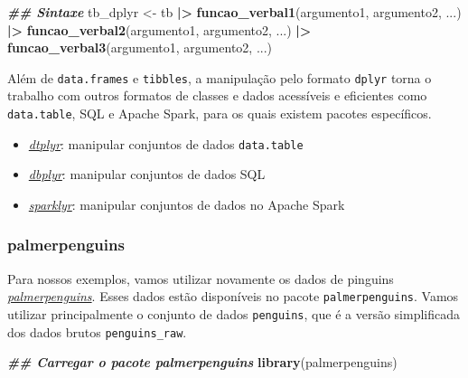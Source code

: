 \documentclass[
]{article}
\newenvironment{Shaded}{\begin{snugshade}}{\end{snugshade}}
\newcommand{\DocumentationTok}[1]{\textcolor[rgb]{0.56,0.35,0.01}{\textbf{\textit{#1}}}}
\newcommand{\FunctionTok}[1]{\textcolor[rgb]{0.13,0.29,0.53}{\textbf{#1}}}
\newcommand{\NormalTok}[1]{#1}
\newcommand{\OtherTok}[1]{\textcolor[rgb]{0.56,0.35,0.01}{#1}}
\newcommand{\SpecialCharTok}[1]{\textcolor[rgb]{0.81,0.36,0.00}{\textbf{#1}}}
\providecommand{\tightlist}{%
  \setlength{\itemsep}{0pt}\setlength{\parskip}{0pt}}
\begin{document}
\begin{Shaded}
\begin{Highlighting}[]
\DocumentationTok{\#\# Sintaxe}
\NormalTok{tb\_dplyr }\OtherTok{\textless{}{-}}\NormalTok{ tb }\SpecialCharTok{|\textgreater{}} 
    \FunctionTok{funcao\_verbal1}\NormalTok{(argumento1, argumento2, ...) }\SpecialCharTok{|\textgreater{}} 
    \FunctionTok{funcao\_verbal2}\NormalTok{(argumento1, argumento2, ...) }\SpecialCharTok{|\textgreater{}} 
    \FunctionTok{funcao\_verbal3}\NormalTok{(argumento1, argumento2, ...)}
\end{Highlighting}
\end{Shaded}

Além de \texttt{data.frames} e \texttt{tibbles}, a manipulação pelo formato \texttt{dplyr} torna o trabalho com outros formatos de classes e dados acessíveis e eficientes como \texttt{data.table}, SQL e Apache Spark, para os quais existem pacotes específicos.

\begin{itemize}
\tightlist
\item
  \href{https://dtplyr.tidyverse.org/}{\emph{dtplyr}}: manipular conjuntos de dados \texttt{data.table}
\item
  \href{https://dbplyr.tidyverse.org/}{\emph{dbplyr}}: manipular conjuntos de dados SQL
\item
  \href{https://spark.rstudio.com/}{\emph{sparklyr}}: manipular conjuntos de dados no Apache Spark
\end{itemize}

\hypertarget{palmerpenguins-1}{%
\subsubsection{palmerpenguins}\label{palmerpenguins-1}}

Para nossos exemplos, vamos utilizar novamente os dados de pinguins \href{https://allisonhorst.github.io/palmerpenguins}{\emph{palmerpenguins}}. Esses dados estão disponíveis no pacote \texttt{palmerpenguins}. Vamos utilizar principalmente o conjunto de dados \texttt{penguins}, que é a versão simplificada dos dados brutos \texttt{penguins\_raw}.

\begin{Shaded}
\begin{Highlighting}[]
\DocumentationTok{\#\# Carregar o pacote palmerpenguins}
\FunctionTok{library}\NormalTok{(palmerpenguins)}
\end{Highlighting}
\end{Shaded}
\end{document}
